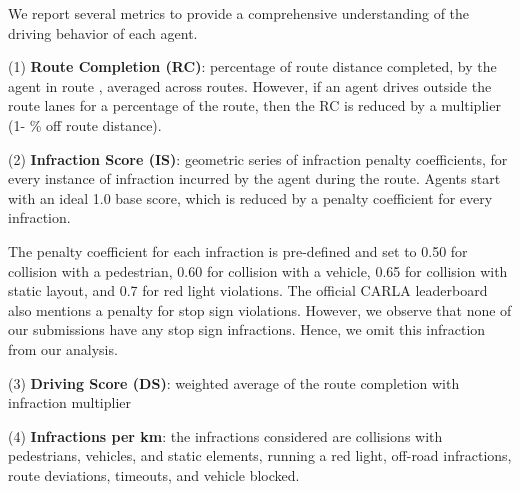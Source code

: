 We report several metrics to provide a comprehensive understanding of the driving behavior of each agent.

\noindent (1) \textbf{Route Completion (RC)}: percentage of route distance completed,  by the agent in route , averaged across  routes. However, if an agent drives outside the route lanes for a percentage of the route, then the RC is reduced by a multiplier (1- \% off route distance).


\noindent (2) \textbf{Infraction Score (IS)}: geometric series of infraction penalty coefficients,  for every instance of infraction  incurred by the agent during the route. Agents start with an ideal 1.0 base score, which is reduced by a penalty coefficient for every infraction.

The penalty coefficient for each infraction is pre-defined and set to 0.50 for collision with a pedestrian, 0.60 for collision with a vehicle, 0.65 for collision with static layout, and 0.7 for red light violations. The official CARLA leaderboard also mentions a penalty for stop sign violations. However, we observe that none of our submissions have any stop sign infractions. Hence, we omit this infraction from our analysis.
\BlankLine

\noindent (3) \textbf{Driving Score (DS)}: weighted average of the route completion with infraction multiplier 


\noindent (4) \textbf{Infractions per km}: the infractions considered are collisions with pedestrians, vehicles, and static elements, running a red light, off-road infractions, route deviations, timeouts, and vehicle blocked.


